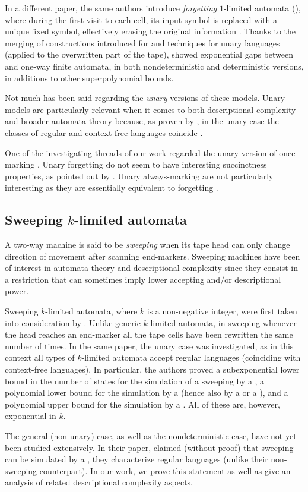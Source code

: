 In a different paper, the same authors introduce \emph{forgetting} $1$-limited automata (\FOLA), where during the first visit to each cell, its input symbol is replaced with a unique fixed symbol, effectively erasing the original information \cite{PigPri23,JanMra+93}.
Thanks to the merging of constructions introduced for \AMOLA and techniques for unary languages (applied to the overwritten part of the tape), \citeauthor{PigPri23} showed exponential gaps between \AMOLA and one-way finite automata, in both nondeterministic and deterministic versions, in additions to other superpolynomial bounds.

Not much has been said regarding the \emph{unary} versions of these models.
Unary models are particularly relevant when it comes to both descriptional complexity and broader automata theory because, as proven by \citeauthor{GinRic62}, in the unary case the classes of regular and context-free languages coincide \cite{GinRic62}.

One of the investigating threads of our work regarded the unary version of once-marking \OLAs.
Unary forgetting \OLAs do not seem to have interesting succinctness properties, as pointed out by \citeauthor{PigPri23} \cite{PigPri23}.
Unary always-marking \OLAs are not particularly interesting as they are essentially equivalent to forgetting \OLA.


\subsection{Sweeping \texorpdfstring{$k$}{k}-limited automata}
A two-way machine is said to be \emph{sweeping} when its tape head can only change direction of movement after scanning end-markers.
Sweeping machines have been of interest in automata theory and descriptional complexity since they consist in a restriction that can sometimes imply lower accepting and/or descriptional power.

Sweeping $k$-limited automata, where $k$ is a non-negative integer, were first taken into consideration by \citeauthor{KutPig+18} \cite{KutPig+18}.
Unlike generic $k$-limited automata, in sweeping \kLA whenever the head reaches an end-marker all the tape cells have been rewritten the same number of times.
In the same paper, the unary case was investigated, as in this context all types of $k$-limited automata accept regular languages (coinciding with context-free languages).
In particular, the authors proved a subexponential lower bound in the number of states for the simulation of a sweeping \kDLA by a \ODFA, a polynomial lower bound for the simulation by a \TNFA (hence also by a \TDFA or a \ONFA), and a polynomial upper bound for the simulation by a \TDFA.
All of these are, however, exponential in $k$.

The general (non unary) case, as well as the nondeterministic case, have not yet been studied extensively.
In their paper, \citeauthor{KutPig+18} claimed (without proof) that sweeping \kLAs can be simulated by a \ONFA, \ie they characterize regular languages (unlike their non-sweeping counterpart).
In our work, we prove this statement as well as give an analysis of related descriptional complexity aspects.
